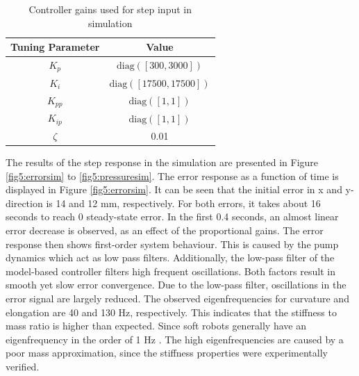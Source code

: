 \begin{table}[H]
    \centering
    \begin{tabular}{|c|c|} \hline
     \textbf{Tuning Parameter}    & \textbf{Value}  \\ \hline
    $K_p$ & $\text{diag}([300,3000])$  \\ \hline
    $K_i$ & $\text{diag}([17500,17500])$  \\ \hline
    $K_{pp}$ & $\text{diag}([1,1])$  \\ \hline
    $K_{ip}$ & $\text{diag}([1,1])$ \\ \hline
    $\zeta$ & 0.01 \\ \hline
    \end{tabular}
    \caption{Controller gains used for step input in simulation}
    \label{tab5:gainssim}
\end{table}


The results of the step response in the simulation are presented in Figure \ref{fig5:errorsim} to \ref{fig5:pressuresim}. The error response as a function of time is displayed in Figure \ref{fig5:errorsim}. It can be seen that the initial error in x and y-direction is 14 and 12 mm, respectively. For both errors, it takes about 16 seconds to reach 0 steady-state error. In the first 0.4 seconds, an almost linear error decrease is observed, as an effect of the proportional gains. The error response then shows first-order system behaviour. This is caused by the pump dynamics which act as low pass filters. Additionally, the low-pass filter of the model-based controller filters high frequent oscillations. Both factors result in smooth yet slow error convergence. Due to the low-pass filter, oscillations in the error signal are largely reduced. The observed eigenfrequencies for curvature and elongation are 40 and 130 Hz, respectively. This indicates that the stiffness to mass ratio is higher than expected. Since soft robots generally have an eigenfrequency in the order of 1 Hz \cite{tawk2018bioinspired}. The high eigenfrequencies are caused by a poor mass approximation, since the stiffness properties were experimentally verified.




